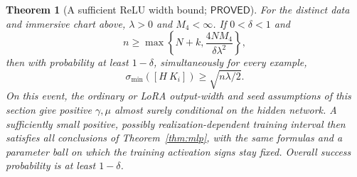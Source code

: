 \documentclass[12pt,a4paper]{article}
\theoremstyle{readable}
\newtheorem{theorem}{Theorem}[section]
\theoremstyle{definition}\newtheorem{example}[theorem]{Example}
\newcommand{\PP}{\mathsf{PROVED}}\newcommand{\FF}{\mathsf{FALSE}}
\begin{document}
\begin{theorem}[A sufficient ReLU width bound; \(\PP\)]\label{thm:relu}
For the distinct data and immersive chart above, \(\lambda>0\) and \(M_4<\infty\). If \(0<\delta<1\) and
\begin{equation}\label{eq:reluwidth}
n\ge\max\left\{N+k,\frac{4NM_4}{\delta\lambda^2}\right\},
\end{equation}
then with probability at least \(1-\delta\), simultaneously for every example,
\[
\sigma_{\min}([H\ K_i])\ge\sqrt{n\lambda/2}.
\]
On this event, the ordinary or LoRA output-width and seed assumptions of this section give positive \(\gamma,\mu\) almost surely conditional on the hidden network. A sufficiently small positive, possibly realization-dependent training interval then satisfies all conclusions of Theorem~\ref{thm:mlp}, with the same formulas and a parameter ball on which the training activation signs stay fixed. Overall success probability is at least \(1-\delta\).
\end{theorem}
\end{document}
